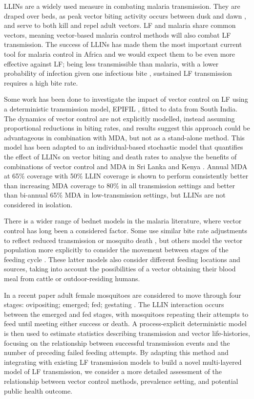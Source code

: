 \documentclass[5p,times]{elsarticle}
\begin{document}
LLINs are a widely used measure in combating malaria transmission. They are draped over beds, as peak vector biting activity occurs between dusk and dawn \cite{korgaonkar2012}, and serve to both kill and repel adult vectors. LF and malaria share common vectors, meaning vector-based malaria control methods will also combat LF transmission. The success of LLINs has made them the most important current tool for malaria control in Africa \cite{killeen2007} and we would expect them to be even more effective against LF; being less transmissible than malaria, with a lower probability of infection given one infectious bite \cite{bogh1998}, sustained LF transmission requires a high bite rate.

Some work has been done to investigate the impact of vector control on LF using a deterministic transmission model, EPIFIL \cite{norman2000}, fitted to data from South India. The dynamics of vector control are not explicitly modelled, instead assuming proportional reductions in biting rates, and results suggest this approach could be advantageous in combination with MDA, but not as a stand-alone method. This model has been adapted to an individual-based stochastic model that quantifies the effect of LLINs on vector biting and death rates to analyse the benefits of combinations of vector control and MDA in Sri Lanka and Kenya \cite{irvine2015}. Annual MDA at 65\% coverage with 50\% LLIN coverage is shown to perform consistently better than increasing MDA coverage to 80\% in all transmission settings and better than bi-annual 65\% MDA in low-transmission settings, but LLINs are not considered in isolation.

There is a wider range of bednet models in the malaria literature, where vector control has long been a considered factor. Some use similar bite rate adjustments to reflect reduced transmission or mosquito death \cite{griffin2010}, but others model the vector population more explicitly to consider the movement between stages of the feeding cycle \cite{killeen2016,le2007}. These latter models also consider different feeding locations and sources, taking into account the possibilities of a vector obtaining their blood meal from cattle or outdoor-residing humans.

In a recent paper adult female mosquitoes are considered to move through four stages: ovipositing; emerged; fed; gestating \cite{killeen2016}. The LLIN interaction occurs between the emerged and fed stages, with mosquitoes repeating their attempts to feed until meeting either success or death. A process-explicit deterministic model is then used to estimate statistics describing transmission and vector life-histories, focusing on the relationship between successful transmission events and the number of preceding failed feeding attempts. By adapting this method and integrating with existing LF transmission models \cite{norman2000, irvine2015} to build a novel multi-layered model of LF transmission, we consider a more detailed assessment of the relationship between vector control methods, prevalence setting, and potential public health outcome.
\end{document}
